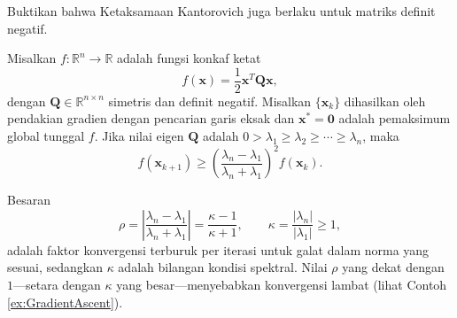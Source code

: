\begin{exercise} Buktikan bahwa Ketaksamaan Kantorovich juga berlaku untuk matriks definit negatif.
\end{exercise}

\begin{theorem}
\label{thm:GradientAscentConverge}
Misalkan $f:\mathbb{R}^n\rightarrow\mathbb{R}$ adalah fungsi konkaf ketat
\begin{equation}
f(\mathbf{x})=\frac{1}{2}\mathbf{x}^T\mathbf{Q}\mathbf{x},
\end{equation}
dengan $\mathbf{Q}\in\mathbb{R}^{n\times n}$ simetris dan definit negatif. Misalkan $\{\mathbf{x}_k\}$ dihasilkan oleh pendakian gradien dengan pencarian garis eksak dan $\mathbf{x}^*=\mathbf{0}$ adalah pemaksimum global tunggal $f$. Jika nilai eigen $\mathbf{Q}$ adalah $0>\lambda_1\geq\lambda_2\geq\cdots\geq\lambda_n$, maka
\begin{equation}
f(\mathbf{x}_{k+1})\geq
\left(\frac{\lambda_n-\lambda_1}{\lambda_n+\lambda_1}\right)^2
f(\mathbf{x}_k).
\end{equation}
\end{theorem}

\begin{remark} Besaran
\begin{displaymath}
\rho=\left|\frac{\lambda_n-\lambda_1}{\lambda_n+\lambda_1}\right|
=\frac{\kappa-1}{\kappa+1},
\qquad
\kappa=\frac{|\lambda_n|}{|\lambda_1|}\geq1,
\end{displaymath}
adalah faktor konvergensi terburuk per iterasi untuk galat dalam norma yang sesuai, sedangkan $\kappa$ adalah bilangan kondisi spektral. Nilai $\rho$ yang dekat dengan $1$---setara dengan $\kappa$ yang besar---menyebabkan konvergensi lambat (lihat Contoh \ref{ex:GradientAscent}).
\end{remark}

